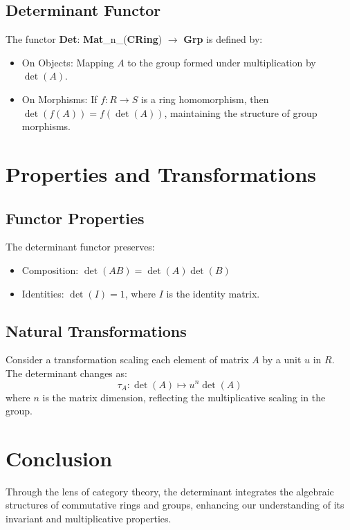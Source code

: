 \subsection{Determinant Functor}
The functor \textbf{Det}: \textbf{Mat}\_n\_(\textbf{CRing}) \(\rightarrow\) \textbf{Grp} is defined by:
\begin{itemize}
	\item On Objects: Mapping \(A\) to the group formed under multiplication by \(\det(A)\).
	\item On Morphisms: If \(f: R \rightarrow S\) is a ring homomorphism, then \(\det(f(A)) = f(\det(A))\), maintaining the structure of group morphisms.
\end{itemize}

\section{Properties and Transformations}
\subsection{Functor Properties}
The determinant functor preserves:
\begin{itemize}
	\item Composition: \(\det(AB) = \det(A)\det(B)\)
	\item Identities: \(\det(I) = 1\), where \(I\) is the identity matrix.
\end{itemize}

\subsection{Natural Transformations}
Consider a transformation scaling each element of matrix \(A\) by a unit \(u\) in \(R\). The determinant changes as:
\[ \tau_A: \det(A) \mapsto u^n \det(A) \]
where \(n\) is the matrix dimension, reflecting the multiplicative scaling in the group.

\section{Conclusion}
Through the lens of category theory, the determinant integrates the algebraic structures of commutative rings and groups, enhancing our understanding of its invariant and multiplicative properties.
